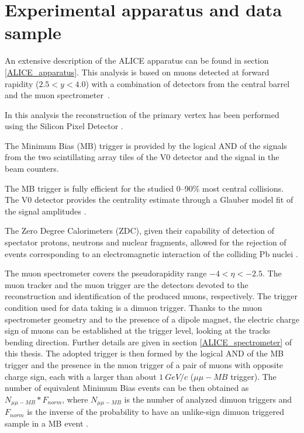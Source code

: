 \section{Experimental apparatus and data sample}
\label{expapp}
An extensive description of the ALICE apparatus can be found in section \ref{ALICE_apparatus}.
This analysis is based on muons detected at forward rapidity ($2.5<y<4.0$) with a combination of detectors from the central barrel and the muon spectrometer~\cite{Aamodt:2011gj}. 

In this analysis the reconstruction of the primary vertex has been performed using the Silicon Pixel Detector \cite{Aamodt:2010aa}.

The Minimum Bias (MB) trigger is provided by the logical AND of the signals from the two scintillating array tiles of the V0 detector \cite{Abbas:2013taa} and the signal in the beam counters.

The MB trigger is fully efficient for the studied 0--90\% most central collisions.
The V0 detector provides the centrality estimate through a Glauber model fit of the signal amplitudes \cite{Abelev:2013qoq,Adam:2015ptt}.

The Zero Degree Calorimeters (ZDC), given their capability of detection of spectator protons, neutrons and nuclear fragments, allowed for the rejection of events corresponding to an electromagnetic interaction of the colliding Pb nuclei \cite{ALICE:2012aa}.

The muon spectrometer covers the pseudorapidity range $-4<\eta<-2.5$.
The muon tracker and the muon trigger are the detectors devoted to the reconstruction and identification of the produced muons, respectively.
The trigger condition used for data taking is a dimuon trigger.
Thanks to the muon spectrometer geometry and to the presence of a dipole magnet, the electric charge sign of muons can be established at the trigger level, looking at the tracks bending direction.
Further details are given in section \ref{ALICE_spectrometer} of this thesis.
The adopted trigger is then formed by the logical AND of the MB trigger and the presence in the muon trigger of a pair of muons with opposite charge sign, each with a \pt larger than about $1\ GeV/c$ ($\mu \mu-MB$ trigger). 
The number of equivalent Minimum Bias events can be then obtained as $N_{\mu \mu-MB} * F_{norm}$, where $N_{\mu \mu-MB}$ is the number of analyzed dimuon triggers and $F_{norm}$ is the inverse of the probability to have an unlike-sign dimuon triggered sample in a MB event \cite{Adam:2016rdg}.

